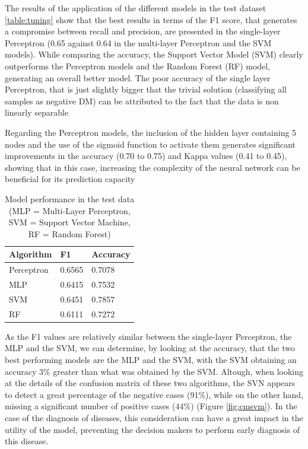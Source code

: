 \documentclass[10pt,twocolumn,letterpaper]{article}
\begin{document}
The results of the application of the different models in the test dataset \ref{table:tuning} show that the best results in terms of the F1 score, that generates a compromise between recall and precision, are presented in the single-layer Perceptron (0.65 against 0.64 in the multi-layer Perceptron and the SVM models). While comparing the accuracy, the Support Vector Model (SVM) clearly outperforms the Perceptron models and the Random Forest (RF) model, generating an overall better model. The poor accuracy of the single layer Perceptron, that is just slightly bigger that the trivial solution (classifying all samples as negative DM) can be attributed to the fact that the data is non linearly separable \cite{Ripley1996}

Regarding the Perceptron models, the inclusion of the hidden layer containing 5 nodes and the use of the sigmoid function to activate them generates significant improvements in the accuracy (0.70 to 0.75) and Kappa values (0.41 to 0.45), showing that in this case, increasing the complexity of the neural network can be beneficial for its prediction capacity

\begin{table}[h]
	\begin{center}
		\begin{tabular}{|p{1.8cm}|p{1.5cm}|p{1.5cm}|}
			\hline
			Algorithm & F1 & Accuracy \\
			\hline\hline
			Perceptron & 0.6565 & 0.7078 \\
			MLP & 0.6415 & 0.7532 \\
			SVM & 0.6451 & 0.7857 \\
			RF & 0.6111 & 0.7272 \\
			\hline
		\end{tabular}
	\end{center}
	\caption{Model performance in the test data (MLP = Multi-Layer Perceptron, SVM = Support Vector Machine, RF = Random Forest)}
	\label{table:testing}
\end{table}

As the F1 values are relatively similar between the single-layer Perceptron, the MLP and the SVM, we can determine, by looking at the accuracy, that the two best performing models are the MLP and the SVM, with the SVM obtaining an accuracy 3\% greater than what was obtained by the SVM. Altough, when looking at the details of the confusion matrix of these two algorithms, the SVN appears to detect a great percentage of the negative cases (91\%), while on the other hand, missing a significant number of positive cases (44\%) (Figure \ref{fig:cmsvm}). In the case of the diagnosis of diseases, this consideration can have a great impact in the utility of the model, preventing the decision makers to perform early diagnosis of this disease.
\end{document}
